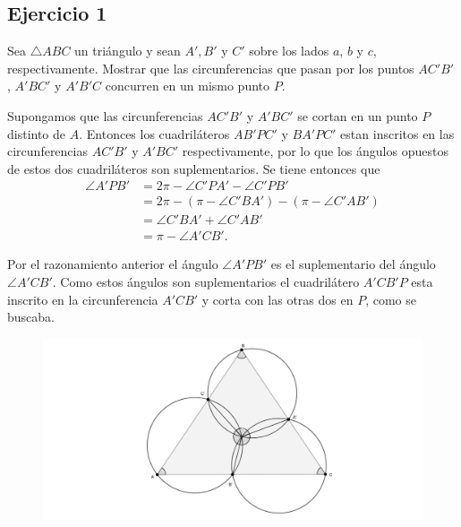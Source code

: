 


		\thispagestyle{plain}
		\subsection*{Ejercicio 1}
		Sea $\bigtriangleup ABC$ un triángulo y sean $A\prime, B'$ y $C'$ sobre los lados $a$, $b$ y
		$c$, respectivamente. Mostrar que las circunferencias que pasan por los
		puntos $AC'B'$ , $A'BC'$ y $A'B'C$ concurren en un mismo punto $P$.
		
		\begin{sol}
		Supongamos que las circunferencias $AC'B'$ y $A'BC'$ se cortan en un punto $P$ distinto de $A$. Entonces los cuadriláteros $AB'PC'$ y $BA'PC'$ estan inscritos en las circunferencias $AC'B'$ y $A'BC'$ respectivamente, por lo que los ángulos opuestos de estos dos cuadriláteros son suplementarios. Se tiene entonces que
		\begin{align*}
			\angle A'PB' &= 2\pi-\angle C'PA'-\angle C'PB' \\
						 &= 2\pi - (\pi-\angle C'BA') - (\pi-\angle C'AB') \\
						 &= \angle C'BA' + \angle C'AB' \\
						 &= \pi-\angle A'CB'.
		\end{align*}
		
		Por el razonamiento anterior el ángulo $\angle A'PB'$ es el suplementario del ángulo $\angle A'CB'$. Como estos ángulos son suplementarios el cuadrilátero \linebreak$A'CB'P$ esta inscrito en la circunferencia $A'CB'$ y corta con las otras dos en $P$, como se buscaba.
		\begin{figure}[H]\centering
			\includegraphics[width=1\linewidth]{pics/g4}
		\end{figure}
		\end{sol}
